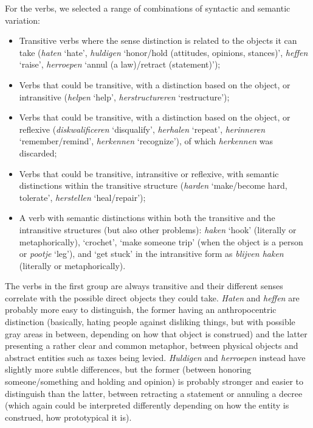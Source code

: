 \documentclass[
]{book}
\begin{document}
For the verbs, we selected a range of combinations of syntactic and semantic variation:

\begin{itemize}
\item
  Transitive verbs where the sense distinction is related to the objects it can take (\emph{haten} `hate', \emph{huldigen} `honor/hold (attitudes, opinions, stances)', \emph{heffen} `raise', \emph{herroepen} `annul (a law)/retract (statement)');
\item
  Verbs that could be transitive, with a distinction based on the object, or intransitive (\emph{helpen} `help', \emph{herstructureren} `restructure');
\item
  Verbs that could be transitive, with a distinction based on the object, or reflexive (\emph{diskwalificeren} `disqualify', \emph{herhalen} `repeat', \emph{herinneren} `remember/remind', \emph{herkennen} `recognize'), of which \emph{herkennen} was discarded;
\item
  Verbs that could be transitive, intransitive or reflexive, with semantic distinctions within the transitive structure (\emph{harden} `make/become hard, tolerate', \emph{herstellen} `heal/repair');
\item
  A verb with semantic distinctions within both the transitive and the intransitive structures (but also other problems): \emph{haken} `hook' (literally or metaphorically), `crochet', `make someone trip' (when the object is a person or \emph{pootje} `leg'), and `get stuck' in the intransitive form as \emph{blijven haken} (literally or metaphorically).
\end{itemize}

The verbs in the first group are always transitive and their different senses correlate with the possible direct objects they could take. \emph{Haten} and \emph{heffen} are probably more easy to distinguish, the former having an anthropocentric distinction (basically, hating people against disliking things, but with possible gray areas in between, depending on how that object is construed) and the latter presenting a rather clear and common metaphor, between physical objects and abstract entities such as taxes being levied.
\emph{Huldigen} and \emph{herroepen} instead have slightly more subtle differences, but the former (between honoring someone/something and holding and opinion) is probably stronger and easier to distinguish than the latter, between retracting a statement or annuling a decree (which again could be interpreted differently depending on how the entity is construed, how prototypical it is).
\end{document}
